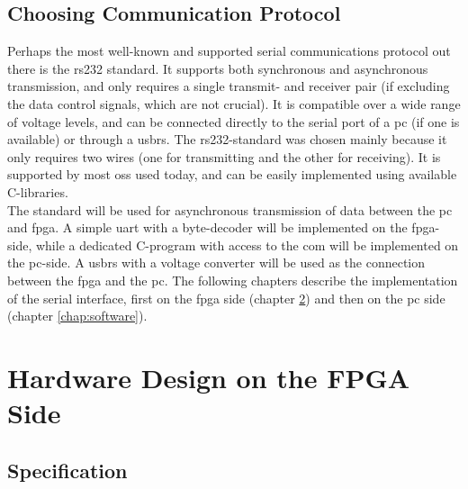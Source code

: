 \documentclass[main.tex]{subfiles}
\begin{document}
\section{Choosing Communication Protocol}
Perhaps the most well-known and supported serial communications protocol out there is the \acrshort{rs232} standard. It supports both synchronous and asynchronous transmission, and only requires a single transmit- and receiver pair (if excluding the data control signals, which are not crucial). It is compatible over a wide range of voltage levels, and can be connected directly to the serial port of a \acrshort{pc} (if one is available) or through a \gls{usbrs}. The \acrshort{rs232}-standard was chosen mainly because it only requires two wires (one for transmitting and the other for receiving). It is supported by most \glspl{os} used today, and can be easily implemented using available C-libraries.\\

The standard will be used for asynchronous transmission of data between the \acrshort{pc} and \gls{fpga}. A simple \gls{uart} with a byte-decoder will be implemented on the \gls{fpga}-side, while a dedicated C-program with access to the \gls{com} will be implemented on the \acrshort{pc}-side. A \gls{usbrs} with a voltage converter will be used as the connection between the \gls{fpga} and the \acrshort{pc}. The following chapters describe the implementation of the serial interface, first on the \gls{fpga} side (chapter \ref{chap:hardware}) and then on the \gls{pc} side (chapter \ref{chap:software}).



\chapter{Hardware Design on the FPGA Side} \label{chap:hardware}

\section{Specification}
\end{document}
